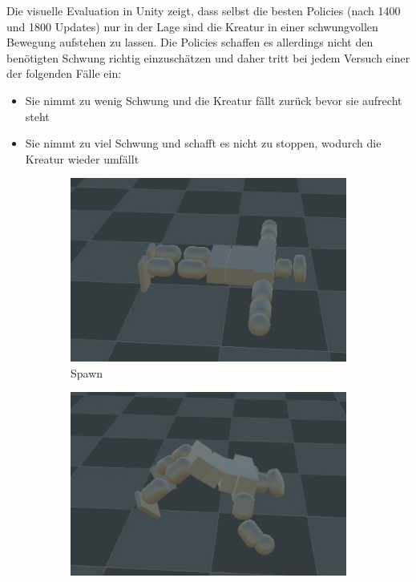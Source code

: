 Die visuelle Evaluation in Unity zeigt, dass selbst die besten Policies (nach 1400 und 1800 Updates) nur in der Lage sind die Kreatur in einer schwungvollen Bewegung aufstehen zu lassen. Die Policies schaffen es allerdings nicht den benötigten Schwung richtig einzuschätzen und daher tritt bei jedem Versuch einer der folgenden Fälle ein:
\begin{itemize}
	\item Sie nimmt zu wenig Schwung und die Kreatur fällt zurück bevor sie aufrecht steht
	\item Sie nimmt zu viel Schwung und schafft es nicht zu stoppen, wodurch die Kreatur wieder umfällt
\end{itemize}
\begin{figure}
	\centering
	\begin{subfigure}[b]{0.2\textwidth}
		\centering
		\includegraphics[width=\textwidth]{resources/img/2BAufstehen/Fall1_spawn}
		\caption{Spawn}
	\end{subfigure}
	\hfill
	\begin{subfigure}[b]{0.2\textwidth}
		\centering
		\includegraphics[width=\textwidth]{resources/img/2BAufstehen/Fall1_hoch}

\end{subfigure}
\end{figure}
